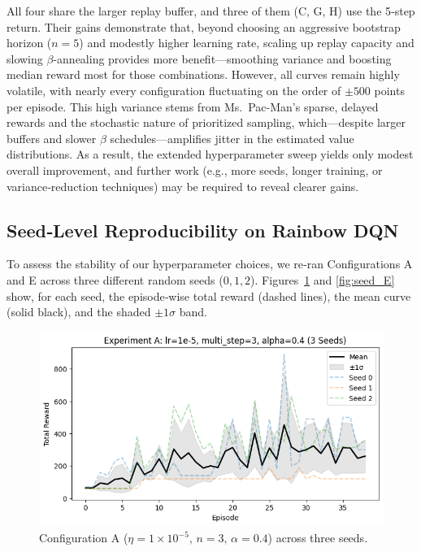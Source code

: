 \documentclass{article}
\begin{document}
All four share the larger replay buffer, and three of them (C, G, H) use the 5‑step return. Their gains demonstrate that, beyond choosing an aggressive bootstrap horizon (\(n=5\)) and modestly higher learning rate, scaling up replay capacity and slowing \(\beta\)-annealing provides more benefit—smoothing variance and boosting median reward most for those combinations. However, all curves remain highly volatile, with nearly every configuration fluctuating on the order of \(\pm500\) points per episode. This high variance stems from Ms.\ Pac-Man’s sparse, delayed rewards and the stochastic nature of prioritized sampling, which—despite larger buffers and slower \(\beta\) schedules—amplifies jitter in the estimated value distributions. As a result, the extended hyperparameter sweep yields only modest overall improvement, and further work (e.g., more seeds, longer training, or variance‐reduction techniques) may be required to reveal clearer gains.  

\subsection{Seed‐Level Reproducibility on Rainbow DQN}

To assess the stability of our hyperparameter choices, we re‑ran Configurations A and E across three different random seeds (\(0,1,2\)). Figures~\ref{fig:seed_A} and \ref{fig:seed_E} show, for each seed, the episode‑wise total reward (dashed lines), the mean curve (solid black), and the shaded \(\pm1\sigma\) band.

\begin{figure}[ht]
  \centering
  \includegraphics[width=0.8\linewidth]{rainbow_A_seed.png}
  \caption{Configuration A (\(\eta=1\times10^{-5},\,n=3,\,\alpha=0.4\)) across three seeds.}
  \label{fig:seed_A}
\end{figure}
\end{document}
